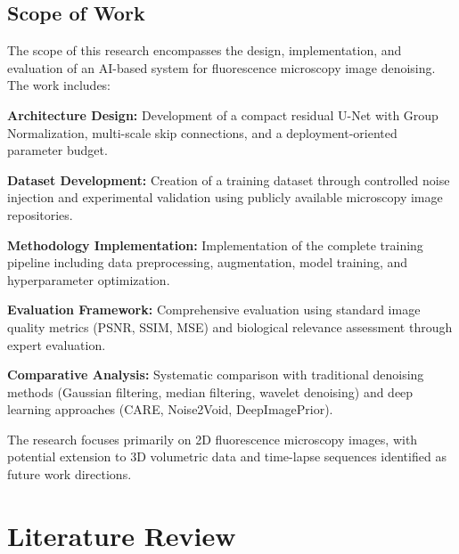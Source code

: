 \documentclass[12pt,a4paper]{report}
\begin{document}
\section{Scope of Work}

The scope of this research encompasses the design, implementation, and evaluation of an AI-based system for fluorescence microscopy image denoising. The work includes:

\vspace{0.5cm}

\textbf{Architecture Design:} Development of a compact residual U-Net with Group Normalization, multi-scale skip connections, and a deployment-oriented parameter budget.

\vspace{0.5cm}

\textbf{Dataset Development:} Creation of a training dataset through controlled noise injection and experimental validation using publicly available microscopy image repositories.

\vspace{0.5cm}

\textbf{Methodology Implementation:} Implementation of the complete training pipeline including data preprocessing, augmentation, model training, and hyperparameter optimization.

\vspace{0.5cm}

\textbf{Evaluation Framework:} Comprehensive evaluation using standard image quality metrics (PSNR, SSIM, MSE) and biological relevance assessment through expert evaluation.

\vspace{0.5cm}

\textbf{Comparative Analysis:} Systematic comparison with traditional denoising methods (Gaussian filtering, median filtering, wavelet denoising) and deep learning approaches (CARE, Noise2Void, DeepImagePrior).

\vspace{0.5cm}

The research focuses primarily on 2D fluorescence microscopy images, with potential extension to 3D volumetric data and time-lapse sequences identified as future work directions.

\chapter{Literature Review}
\label{chap:literature}
\end{document}
